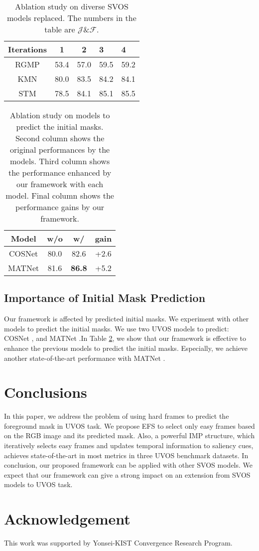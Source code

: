 \documentclass[letterpaper]{article} \usepackage{aaai22}  \usepackage{times}  \usepackage{helvet}  \usepackage{courier}  \usepackage[hyphens]{url}  \usepackage{graphicx} \urlstyle{rm} \def\UrlFont{\rm}  \usepackage{natbib}  \usepackage{caption} \DeclareCaptionStyle{ruled}{labelfont=normalfont,labelsep=colon,strut=off} \frenchspacing  \setlength{\pdfpagewidth}{8.5in}  \setlength{\pdfpageheight}{11in}  \usepackage{algorithm}
\begin{document}
\begin{table}[h]
\centering
\caption{Ablation study on diverse SVOS models replaced. The numbers in the table are $\mathcal{J}$\&$\mathcal{F}$.}
\label{table7}
\begin{tabular}{@{}c|ccll@{}}
\toprule
Iterations & 1    & 2    & 3    & 4    \\ \midrule
RGMP       & 53.4 & 57.0 & 59.5 & 59.2 \\
KMN        & 80.0 & 83.5 & 84.2 & 84.1 \\
STM        & 78.5 & 84.1 & 85.1 & 85.5 \\ \bottomrule
\end{tabular}
\end{table}

\begin{table}[h]
\centering
\caption{Ablation study on models to predict the initial masks. Second column shows the original performances by the models. Third column shows the performance enhanced by our framework with each model. Final column shows the performance gains by our framework.}
\label{table8}
\begin{tabular}{@{}c|c|c|c@{}}
\toprule
Model  & w/o  & w/   & gain \\ \midrule
COSNet & 80.0 & 82.6 & +2.6  \\
MATNet & 81.6 & \textbf{86.8} & +5.2  \\ \bottomrule
\end{tabular}
\end{table}

\subsection{Importance of Initial Mask Prediction}

Our framework is affected by predicted initial masks. We experiment with other models to predict the initial masks. We use two UVOS models to predict: COSNet \citep{lu2019see}, and MATNet \citep{zhou2020motion}.In Table \ref{table8}, we show that our framework is effective to enhance the previous models to predict the initial masks. Especially, we achieve another state-of-the-art performance with MATNet \citep{zhou2020motion}.

\section{Conclusions}

In this paper, we address the problem of using hard frames to predict the foreground mask in UVOS task. We propose EFS to select only easy frames based on the RGB image and its predicted mask. Also, a powerful IMP structure, which iteratively selects easy frames and updates temporal information to saliency cues, achieves state-of-the-art in most metrics in three UVOS benchmark datasets. In conclusion, our proposed framework can be applied with other SVOS models. We expect that our framework can give a strong impact on an extension from SVOS models to UVOS task. 

\section{Acknowledgement}

This work was supported by Yonsei-KIST Convergence Research Program.


\end{document}
